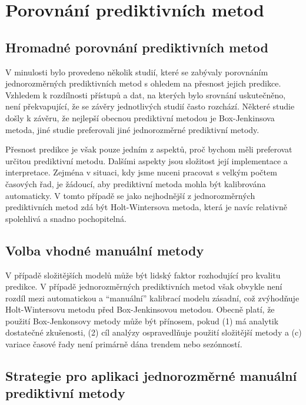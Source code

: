 \section{Porovnání prediktivních metod}

\subsection{Hromadné porovnání prediktivních metod}

V minulosti bylo provedeno několik studií, které se zabývaly porovnáním jednorozměrných prediktivních metod s ohledem na přesnost jejich predikce. Vzhledem k rozdílnosti přístupů a dat, na kterých bylo srovnání uskutečněno, není překvapující, že se závěry jednotlivých studií často rozchází. Některé studie došly k závěru, že nejlepší obecnou prediktivní metodou je Box-Jenkinsova metoda, jiné studie preferovali jiné jednorozměrné prediktivní metody.

Přesnost predikce je však pouze jedním z aspektů, proč bychom měli preferovat určitou prediktivní metodu. Dalšími aspekty jsou složitost její implementace a interpretace. Zejména v situaci, kdy jsme nuceni pracovat s velkým počtem časových řad, je žádoucí, aby prediktivní metoda mohla být kalibrována automaticky. V tomto případě se jako nejhodnější z jednorozměrných prediktivních metod zdá být Holt-Wintersova metoda, která je navíc relativně spolehlivá a snadno pochopitelná.

\subsection{Volba vhodné manuální metody}

V případě složitějších modelů může být lidský faktor rozhodující pro kvalitu predikce. V případě jednorozměrných prediktivních metod však obvykle není rozdíl mezi automatickou a ``manuální'' kalibrací modelu zásadní, což zvýhodňuje Holt-Wintersovu metodu před Box-Jenkinsovou metodou. Obecně platí, že použití Box-Jenkonsovy metody může být přínosem, pokud (1) má analytik dostatečné zkušenosti, (2) cíl analýzy ospravedlňuje použití složitější metody a (c) variace časové řady není primárně dána trendem nebo sezónností.

\subsection{Strategie pro aplikaci jednorozměrné manuální prediktivní metody}

